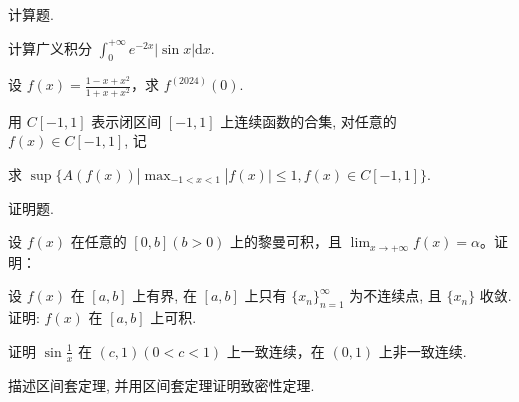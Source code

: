 \par{}
计算题.\par
计算广义积分 $\int_0^{+\infty} e^{-2x} |\sin x| \mathrm{d}x$.\par
设 $f(x) = \frac{1 - x + x^2}{1 + x + x^2}$，求 $f^{(2024)}(0)$.\par
\par{}
用 $C[-1,1]$ 表示闭区间 $[-1,1]$ 上连续函数的合集, 对任意的 $f(x) \in C[-1,1]$, 记\par
\nopagebreak[4]
求 $\sup \{A(f(x)) | \max_{-1 < x < 1} |f(x)| \leq 1, f(x) \in C[-1, 1]\}$.\par
\par{}
证明题.\par
\par{}
设 $f(x)$ 在任意的 $[0, b] (b > 0)$ 上的黎曼可积，且 $\lim_{x \to +\infty} f(x) = \alpha$。证明：\par
\nopagebreak[4]
设 $f(x)$ 在 $[a, b]$ 上有界, 在 $[a, b]$ 上只有 $\{x_n\}_{n=1}^{\infty}$ 为不连续点, 且 $\{x_n\}$ 收敛. 证明: $f(x)$ 在 $[a, b]$ 上可积.\par
证明 $\sin \frac{1}{x}$ 在 $(c,1)(0 < c < 1)$ 上一致连续，在 $(0,1)$ 上非一致连续.\par
描述区间套定理, 并用区间套定理证明致密性定理.\par
